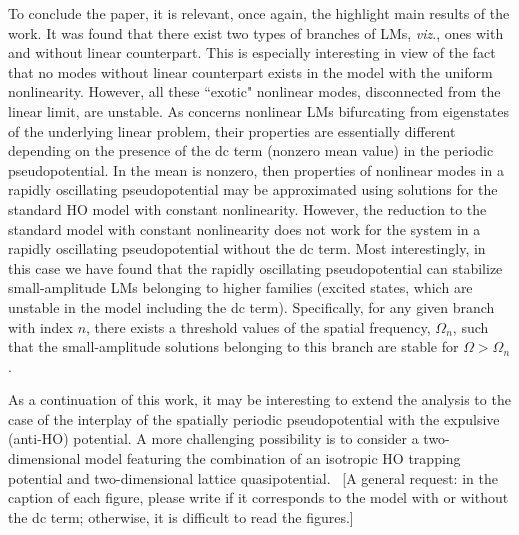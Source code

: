\documentclass[aps,preprint,showkeys,
]{revtex4}
\begin{document}

To conclude the paper, it is relevant, once again, the highlight main
results of the work. %
It was found that there exist two types of branches of LMs, \textit{viz}.,
ones with and without linear counterpart. This is especially interesting in
view of the fact that no modes without linear counterpart exists in the
model with the uniform nonlinearity. However, all these ``exotic" 
nonlinear modes, disconnected from the linear limit, are unstable.
As concerns nonlinear LMs bifurcating from eigenstates of the underlying
linear problem, their properties are essentially different depending on the
presence of the dc term (nonzero mean value) in the periodic
pseudopotential. In the mean is nonzero, then properties of nonlinear modes
in a rapidly oscillating pseudopotential may be approximated using solutions
for the standard HO model with constant nonlinearity. However, the reduction
to the standard model with constant nonlinearity does not work for the
system in a rapidly oscillating pseudopotential without the dc term. Most
interestingly, in this case we have found that the rapidly oscillating
pseudopotential can stabilize small-amplitude LMs belonging to higher
families (excited states, which are unstable in the model including the dc
term). Specifically, for any given branch with index $n$, there exists a
threshold values of the spatial frequency, $\Omega _{n}$, such that the
small-amplitude solutions belonging to this branch are stable for $\Omega
>\Omega _{n}$.

As a continuation of this work, it may be interesting to extend the analysis
to the case of the interplay of the spatially periodic pseudopotential with
the expulsive (anti-HO) potential. A more challenging possibility is to
consider a two-dimensional model featuring the combination of an isotropic
HO trapping potential and two-dimensional lattice quasipotential.
{\LARGE \ [A general request: in the caption of each figure, please write if
it corresponds to the model with or without the dc term; otherwise, it is
difficult to read the figures.]}
\end{document}
